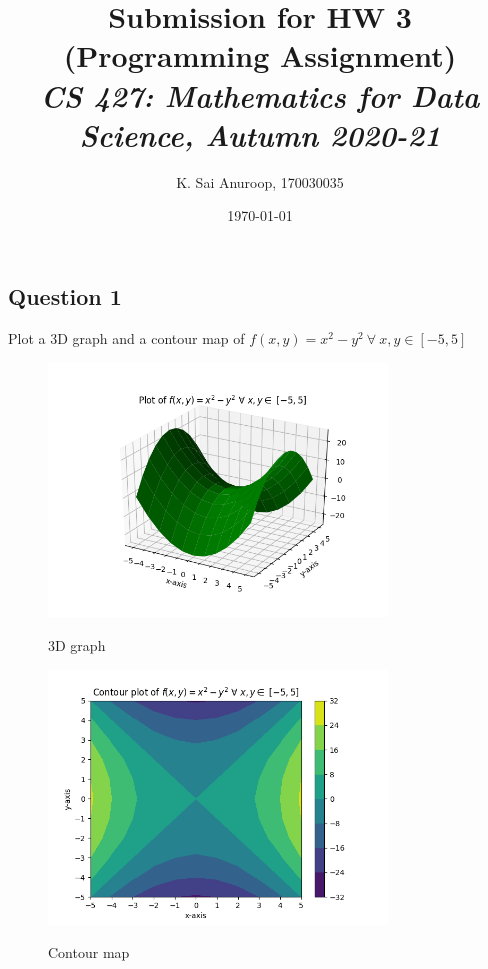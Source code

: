 \documentclass{article}
\title{Submission for HW 3 (Programming Assignment)\\\small{\textit{CS 427: Mathematics for Data Science, Autumn 2020-21}}}
\author{K. Sai Anuroop, 170030035}
\date{\today}
\begin{document}
 \maketitle

 \begin{flushleft}
 \section{Question 1}
 Plot a 3D graph and a contour map of $f(x,y)=x^2-y^2\ \forall\ x,y\in[-5,5]$
 \begin{figure}[htp]
         \centering
         \includegraphics[width=9cm]{x2y2_saddle_surface.png}\\
         \caption{3D graph}
 \end{figure}
 \begin{figure}[htp]
         \centering
         \includegraphics[width=9cm]{x2y2_saddle_contour.png}\\
         \caption{Contour map}
 \end{figure}
 \clearpage

\end{flushleft}
\end{document}
